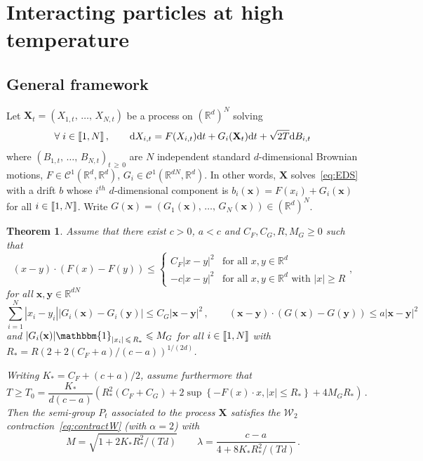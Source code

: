 \documentclass[10pt]{amsart}
\newtheorem{theo}{Theorem}[section]
\theoremstyle{definition}\newtheorem{defi}[theo]{Definition}\newtheorem{rema}[theo]{Remark}\newtheorem{exam}[theo]{Example}\newtheorem{exem}[theo]{Example}\newtheorem{nota}[theo]{Notation}
\newcommand{\llbracket}{\mathopen{[\mkern -2.7mu[}}
\newcommand{\rrbracket}{\mathclose{]\mkern -2.7mu]}}
\newcommand{\R}{\mathbb R}
\newcommand{\clC}{\mathcal C}
\newcommand{\clW}{\mathcal W}
\newcommand{\dd}{\mathrm{d}}
\newcommand{\1}{\mathbbm{1}}
\newcommand{\bx}{\mathbf{x}}
\newcommand{\by}{\mathbf{y}}
\newcommand{\bX}{\mathbf{X}}
\let\oldforall\forall
\renewcommand*{\forall}{\mathrel{\oldforall}}
\providecommand{\llbracket}{\mathopen{[\mkern-2.7mu[}}\providecommand{\rrbracket}{\mathclose{]\mkern-2.7mu]}}
\begin{document}
\section{Interacting particles at high temperature}\label{sec:particules}

\subsection{General framework} Let $\bX_t = (X_{1,t},\,\dots,\,X_{N,t})$ be a process on $(\R^d)^N$ solving
\[
\forall i\in\llbracket 1,N\rrbracket\,,\qquad \dd X_{i,t} = F(X_{i,t}) \dd t + G_i(\bX_t) \dd t + \sqrt{2T}\dd B_{i,t}
\]
where $(B_{1,t},\,\dots,\,B_{N,t})_{t\,\geqslant\,0}$ are $N$ independent standard $d$-dimensional Brownian motions, $F\in\clC^1(\R^d,\R^d)$, $G_i\in \clC^1(\R^{dN},\R^{d})$. In other words, $\bX$ solves~\eqref{eq:EDS} with a drift $b$ whose $i^{th}$ $d$-dimensional component is $b_i(\bx)= F(x_i)+G_i(\bx)$ for all $i\in\llbracket 1,N\rrbracket$. Write $G(\bx)=(G_1(\bx),\,\dots,\,G_N(\bx))\in (\R^d)^{N}$.

\begin{theo}\label{thm:particules}
Assume that there exist $c>0$, $a<c$ and $C_F,C_G,R,M_G\geqslant 0$ such that
\begin{equation}\label{eq:F}
(x-y)\cdot (F(x)-F(y)) \leqslant \left\{
\begin{array}{ll}
C_F|x-y|^2 & \text{for all } x,y\in\R^d\\
-c|x-y|^2 & \text{for all } x,y\in\R^d \text{ with } |x|\geqslant R
\end{array}\right.,
\end{equation}
 for all $\bx,\by\in \R^{dN}$
\begin{equation}\label{eq:revision}
\sum_{i=1}^N |x_i-y_i||G_i(\bx) - G_i(\by)| \leqslant C_G |\bx-\by|^2 \,,\qquad (\bx-\by)\cdot (G(\bx)-G(\by)) \leqslant a|\bx-\by|^2
\end{equation}
and $|G_i(\bx)|\1_{|x_i|\,\leqslant\,R_*}\leqslant M_G$ for all $i\in\llbracket 1,N\rrbracket$ with $R_* = R\left( 2+2(C_F+a)/(c-a)\right)^{1/(2d)}$.

Writing $K_* = C_F+(c+a)/2$, assume furthermore that
\[
T \geqslant T_0 = \frac{K_*}{d(c-a)} \left( R_*^2\left(C_F+C_G\right) + 2 \sup\left\{-F(x)\cdot x, |x|\leqslant R_*\right\} +4 M_GR_* \right) \,.
\]
Then the semi-group $P_t$ associated to the process $\bX$ satisfies the $\clW_2$ contraction~\eqref{eq:contractW} (with $\alpha=2$) with
\[
M= \sqrt{1+2K_* R_*^2/(Td)}\qquad \lambda = \frac{c-a}{4+8K_* R_*^2/(Td)}\,.
\]
\end{theo}
\end{document}
